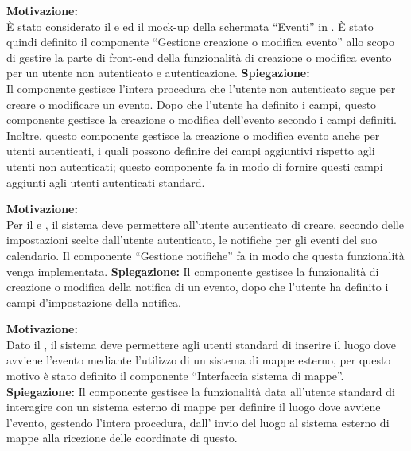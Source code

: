 \begin{listaPersonale}[ACI]{}


    \textbf{Motivazione:}\\
    È stato considerato il  e  ed il mock-up della schermata “Eventi” in .
    È stato quindi definito il componente “Gestione creazione o modifica evento” allo scopo di gestire la parte di front-end della funzionalità di creazione o modifica evento per un utente non autenticato e autenticazione.
    \textbf{Spiegazione:}\\
    Il componente gestisce l'intera procedura che l'utente non autenticato segue per creare o modificare un evento. Dopo che l'utente ha definito i campi, questo componente gestisce la creazione o modifica dell'evento secondo i campi definiti. Inoltre, questo componente gestisce la creazione o modifica evento anche per utenti autenticati, i quali possono definire dei campi aggiuntivi rispetto agli utenti non autenticati; questo componente fa in modo di fornire questi campi aggiunti agli utenti autenticati standard.



    \textbf{Motivazione:}\\
    Per il  e , il sistema deve permettere all'utente autenticato di creare, secondo delle impostazioni scelte dall'utente autenticato, le notifiche per gli eventi del suo calendario. Il componente “Gestione notifiche” fa in modo che questa funzionalità venga implementata.
    \textbf{Spiegazione:} Il componente gestisce la funzionalità di creazione o modifica della notifica di un evento, dopo che l'utente ha definito i campi d'impostazione della notifica.



    \textbf{Motivazione:}\\
    Dato il , il sistema deve permettere agli utenti standard di inserire il luogo dove avviene l'evento mediante l'utilizzo di un sistema di mappe esterno, per questo motivo è stato definito il componente “Interfaccia sistema di mappe”.
    \textbf{Spiegazione:} Il componente gestisce la funzionalità data all'utente standard di interagire con un sistema esterno di mappe per definire il luogo dove avviene l'evento, gestendo l'intera procedura, dall' invio del luogo al sistema esterno di mappe alla ricezione delle coordinate di questo.



\end{listaPersonale}
